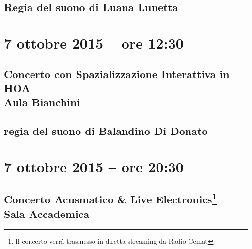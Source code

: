 \documentclass[8pt, twoside, a5paper]{extreport}
\begin{document}
\subsection*{\textsf{Regia del suono di Luana Lunetta}}

\bigskip

\begin{multicols}{2}




\end{multicols}

\clearpage


\section*{7 ottobre 2015 -- ore 12:30}

\subsection*{{\small Concerto con Spazializzazione Interattiva in HOA} \\
	\textsf{Aula Bianchini}}

{\fontsize{30}{30} }

\subsection*{\textsf{regia del suono di Balandino Di Donato}}

\bigskip

\begin{multicols}{2}

%


\end{multicols}

\clearpage

\section*{7 ottobre 2015 -- ore 20:30}

\subsection*{{\small Concerto Acusmatico \& Live Electronics\footnote{ Il concerto verrà trasmesso in diretta streaming da Radio Cemat}} \\
	\textsf{Sala Accademica}}
\end{document}
